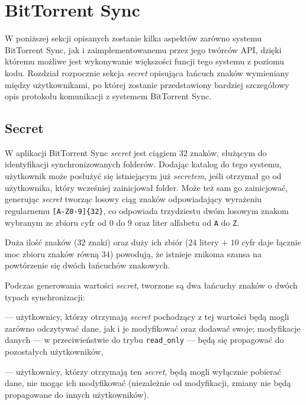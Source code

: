 \section{BitTorrent Sync}

W poniższej sekcji opisanych zostanie kilka aspektów zarówno systemu BitTorrent Sync, jak i zaimplementowanemu przez jego twórców API, dzięki któremu możliwe jest wykonywanie większości funcji tego systemu z poziomu kodu. Rozdział rozpocznie sekcja \emph{secret} opisująca łańcuch znaków wymieniany między użytkownikami, po której zostanie przedstawiony bardziej szczegółowy opis protokołu komunikacji z systemem BitTorrent Sync.

\subsection{Secret}

\label{secret}

W aplikacji BitTorrent Sync \emph{secret} jest ciągiem $32$ znaków, służącym do identyfikacji synchronizowanych folderów. Dodając katalog do tego systemu, użytkownik może posłużyć się istniejącym już \emph{secretem}, jeśli otrzymał go od użytkownika, który wcześniej zainicjował folder. Może też sam go zainicjować, generując \emph{secret} tworząc losowy ciąg znaków odpowiadający wyrażeniu regularnemu \texttt{[A-Z0-9]\{32\}}, co odpowiada trzydziestu dwóm losowym znakom wybranym ze zbioru cyfr od $0$ do $9$ oraz liter alfabetu od \texttt{A} do \texttt{Z}.

Duża ilość znaków ($32$ znaki) oraz duży ich zbiór ($24$ litery $+$ $10$ cyfr daje łącznie moc zbioru znaków równą $34$) powodują, że istnieje znikoma szansa na powtórzenie się dwóch łańcuchów znakowych.

Podczas generowania wartości \emph{secret}, tworzone są dwa łańcuchy znaków o dwóch typach synchronizacji:

\begin{description}[noitemsep]
  \item[read\_write] --- użytkownicy, którzy otrzymają \emph{secret} pochodzący z tej wartości będą mogli zarówno odczytywać dane, jak i je modyfikować oraz dodawać swoje; modyfikacje danych --- w przeciwieństwie do trybu \texttt{read\_only} --- będą się propagować do pozostałych użytkowników,
  
  \item[read\_only] --- użytkownicy, którzy otrzymają ten \emph{secret}, będą mogli wyłącznie pobierać dane, nie mogąc ich modyfikować (niezależnie od modyfikacji, zmiany nie będą propagowane do innych użytkowników).
\end{description}

